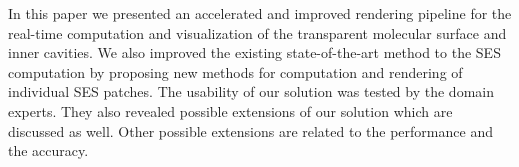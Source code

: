 In this paper we presented an accelerated and improved rendering pipeline for the real-time computation and visualization of the transparent molecular surface and inner cavities.
We also improved the existing state-of-the-art method to the SES computation by proposing new methods for computation and rendering of individual SES patches.
The usability of our solution was tested by the domain experts. 
They also revealed possible extensions of our solution which are discussed as well.
Other possible extensions are related to the performance and the accuracy.
